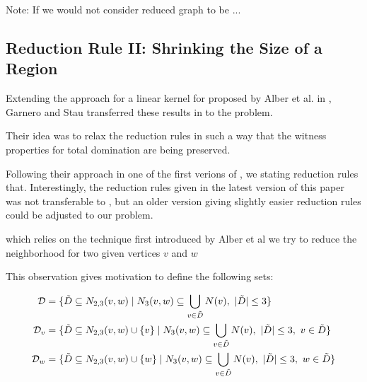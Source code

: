 Note: If we would not consider reduced graph to be ...

\subsection{Reduction Rule II: Shrinking the Size of a Region}


Extending the approach for a linear kernel for \dom proposed by Alber et al. in \cite{Alber2004}, Garnero and Stau transferred these results in \cite{Garnero2018} to the \tdom problem. 

Their idea was to relax the reduction rules in such a way that the witness properties for total domination are being preserved.

Following their approach in one of the first verions of \cite{Garnero2014}, we stating reduction rules that. Interestingly, the reduction rules given in the latest version of this paper was not transferable to \sdom, but an older version giving slightly easier reduction rules could be adjusted to our problem.

which relies on the technique first introduced by Alber et al we try to reduce the neighborhood for two given vertices $v$ and $w$

This observation gives motivation to define the following sets:

\begin{align}
    \mathcal{D} &= \{ \tilde D \subseteq N_{2,3}(v,w)            \mid N_3(v,w) \subseteq \bigcup_{v \in \tilde D} N(v),\ |\tilde D| \leq 3                  \}\\
    \mathcal{D}_{v}  &= \{ \tilde D \subseteq N_{2,3}(v,w) \cup \{v\} \mid N_3(v,w) \subseteq \bigcup_{v \in \tilde D} N(v),\ |\tilde D| \leq 3,\ v \in \tilde D \}\\
    \mathcal{D}_{w}  &= \{ \tilde D \subseteq N_{2,3}(v,w) \cup \{w\} \mid N_3(v,w) \subseteq \bigcup_{v \in \tilde D} N(v),\ |\tilde D| \leq 3,\ w \in \tilde D \}
    \end{align}

